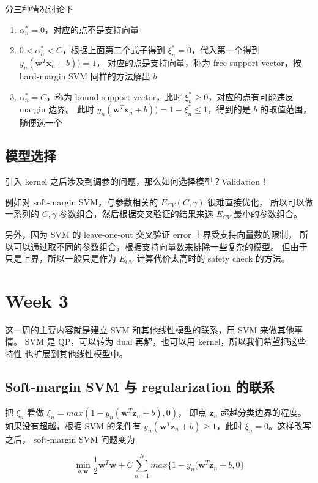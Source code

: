 \documentclass[a4paper]{article}
\begin{document}
分三种情况讨论下
\begin{enumerate}
  \item $\alpha_n^{*} = 0$，对应的点不是支持向量 \\
  \item $0 < \alpha_n^{*} < C$，根据上面第二个式子得到 $\xi_n^{*} = 0$，代入第一个得到 $y_n(\mathbf{w}^T\mathbf{x}_n + b)) = 1$，
        对应的点是支持向量，称为 free support vector，按 hard-margin SVM 同样的方法解出 $b$ \\
  \item $\alpha_n^{*} = C$，称为 bound support vector，此时 $\xi_n^{*} \ge 0$，对应的点有可能违反 margin 边界。
        此时 $y_n(\mathbf{w}^T\mathbf{x}_n + b)) = 1 - \xi_n^{*} \le 1$，得到的是 $b$ 的取值范围，随便选一个 \\
\end{enumerate}

\subsection{模型选择}
引入 kernel 之后涉及到调参的问题，那么如何选择模型？Validation！

例如对 soft-margin SVM，与参数相关的 $E_{CV}(C, \gamma)$ 很难直接优化，
所以可以做一系列的 $C, \gamma$ 参数组合，然后根据交叉验证的结果来选 $E_{CV}$ 最小的参数组合。

另外，因为 SVM 的 leave-one-out 交叉验证 error 上界受支持向量数的限制，
所以可以通过取不同的参数组合，根据支持向量数来排除一些复杂的模型。
但由于只是上界，所以一般只是作为 $E_{CV}$ 计算代价太高时的 safety check 的方法。


\section{Week 3}
这一周的主要内容就是建立 SVM 和其他线性模型的联系，用 SVM 来做其他事情。
SVM 是 QP，可以转为 dual 再解，也可以用 kernel，所以我们希望把这些特性
也扩展到其他线性模型中。

\subsection{Soft-margin SVM 与 regularization 的联系}
把 $\xi_n$ 看做 $\xi_n = max( 1 - y_n(\mathbf{w}^T\mathbf{z}_n + b), 0 )$，
即点 $\mathbf{z}_n$ 超越分类边界的程度。如果没有超越，根据 SVM 的条件有 
$y_n(\mathbf{w}^T\mathbf{z}_n + b) \ge 1 $，此时 $\xi_n = 0$。这样改写之后，
soft-margin SVM 问题变为

$$\min_{b, \mathbf{w}} \frac{1}{2} \mathbf{w}^T\mathbf{w} + C \sum_{n=1}^{N}max\{1 - y_n(\mathbf{w}^T\mathbf{z}_n + b, 0\}$$
\end{document}
